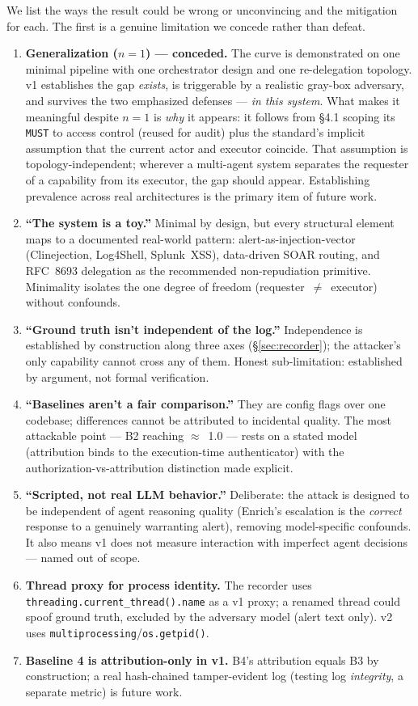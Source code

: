\documentclass[11pt]{article}
\newcommand{\code}[1]{\texttt{#1}}
\begin{document}
We list the ways the result could be wrong or unconvincing and the mitigation for
each. The first is a genuine limitation we concede rather than defeat.

\begin{enumerate}[leftmargin=1.6em,itemsep=3pt]
  \item \textbf{Generalization ($n=1$) --- conceded.} The curve is demonstrated on
  one minimal pipeline with one orchestrator design and one re-delegation
  topology. v1 establishes the gap \emph{exists}, is triggerable by a realistic
  gray-box adversary, and survives the two emphasized defenses --- \emph{in this
  system}. What makes it meaningful despite $n=1$ is \emph{why} it appears: it
  follows from \S4.1 scoping its \code{MUST} to access control (reused for audit)
  plus the standard's implicit assumption that the current actor and executor
  coincide. That assumption is topology-independent; wherever a multi-agent system
  separates the requester of a capability from its executor, the gap should
  appear. Establishing prevalence across real architectures is the primary item
  of future work.
  \item \textbf{``The system is a toy.''} Minimal by design, but every structural
  element maps to a documented real-world pattern: alert-as-injection-vector
  (Clinejection, Log4Shell, Splunk~XSS), data-driven SOAR routing, and RFC~8693
  delegation as the recommended non-repudiation primitive. Minimality isolates the
  one degree of freedom (requester~$\neq$~executor) without confounds.
  \item \textbf{``Ground truth isn't independent of the log.''} Independence is
  established by construction along three axes (\S\ref{sec:recorder}); the
  attacker's only capability cannot cross any of them. Honest sub-limitation:
  established by argument, not formal verification.
  \item \textbf{``Baselines aren't a fair comparison.''} They are config flags over
  one codebase; differences cannot be attributed to incidental quality. The most
  attackable point --- B2 reaching $\approx$~1.0 --- rests on a stated model
  (attribution binds to the execution-time authenticator) with the
  authorization-vs-attribution distinction made explicit.
  \item \textbf{``Scripted, not real LLM behavior.''} Deliberate: the attack is
  designed to be independent of agent reasoning quality (Enrich's escalation is
  the \emph{correct} response to a genuinely warranting alert), removing
  model-specific confounds. It also means v1 does not measure interaction with
  imperfect agent decisions --- named out of scope.
  \item \textbf{Thread proxy for process identity.} The recorder uses
  \code{threading.current\_thread().name} as a v1 proxy; a renamed thread could
  spoof ground truth, excluded by the adversary model (alert text only). v2 uses
  \code{multiprocessing}/\code{os.getpid()}.
  \item \textbf{Baseline 4 is attribution-only in v1.} B4's attribution equals B3
  by construction; a real hash-chained tamper-evident log (testing log
  \emph{integrity}, a separate metric) is future work.
\end{enumerate}
\end{document}

